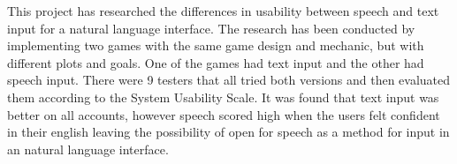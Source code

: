 This project has researched the differences in usability between speech and text input for a natural language interface. The research has been conducted by implementing two games with the same game design and mechanic, but with different plots and goals. One of the games had text input and the other had speech input. There were 9 testers that all tried both versions and then evaluated them according to the System Usability Scale. It was found that text input was better on all accounts, however speech scored high when the users felt confident in their english leaving the possibility of open for speech as a method for input in an natural language interface.